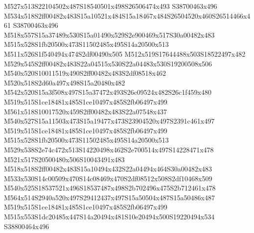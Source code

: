 \documentclass{article}
\begin{document}
\begin{multicols}{2}
M527x513S22104502x487S18540501x498S26506474x493 S38700463x496 M534x518S2ff00482x483S15a10521x484S15a18467x484S26504520x460S26514466x461 S38700463x496 M518x557S15a37489x530S15a01490x529S2e900469x517S30a00482x483 M515x528S1fb20500x473S11502485x495S14a20500x513 M511x526S1f540494x474S2df00490x505 M512x519S17644488x503S18522497x482 M529x545S2ff00482x483S22a04515x530S22a04483x530S19200508x506 M540x520S10011519x490S2ff00482x483S2df08518x462 M520x518S2d60a497x498S15a20480x482 M542x520S15a3f508x497S15a37472x493S26c09524x482S26c1f459x480 M519x515S1ce18481x485S1ce10497x485S2fb06497x499 M561x518S10017520x459S2ff00482x483S22a07548x437 M540x527S15a11503x473S15a19477x473S23904520x497S2391c461x497 M519x515S1ce18481x485S1ce10497x485S2fb06497x499 M515x528S1fb20500x473S11502485x495S14a20500x513 M529x538S2e74c472x513S14220498x462S2e700514x497S14228471x478 M521x517S20500480x506S10043491x483 M518x518S2ff00482x483S15a10494x432S22a04494x464S30a00482x483 M533x530S14c00509x470S14c08469x470S2df08512x508S2df10468x509 M540x525S18537521x496S18537487x498S2b702496x475S2b712461x478 M564x514S2940a520x497S29412437x497S15a50504x487S15a50486x487 M519x515S1ce18481x485S1ce10497x485S2fb06497x499 M515x553S1dc20485x447S14a20494x481S10e20494x500S19220494x534 S38800464x496







\end{multicols}
\end{document}

